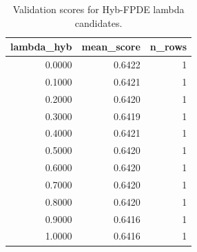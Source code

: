 \begin{table}[t]
\caption{Validation scores for Hyb-FPDE lambda candidates.}
\label{tab:lambda_distribution_computed}
\centering
\begin{tabular}{rrr}
\toprule
lambda\_hyb & mean\_score & n\_rows \\
\midrule
0.0000 & 0.6422 & 1 \\
0.1000 & 0.6421 & 1 \\
0.2000 & 0.6420 & 1 \\
0.3000 & 0.6419 & 1 \\
0.4000 & 0.6421 & 1 \\
0.5000 & 0.6420 & 1 \\
0.6000 & 0.6420 & 1 \\
0.7000 & 0.6420 & 1 \\
0.8000 & 0.6420 & 1 \\
0.9000 & 0.6416 & 1 \\
1.0000 & 0.6416 & 1 \\
\bottomrule
\end{tabular}

\end{table}
